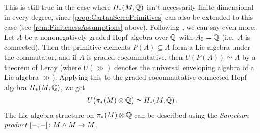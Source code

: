 This is still true in the case where $H_*(M,\mathbb{Q})$ isn't necessarily finite-dimensional in every degree, since \cref{prop:CartanSerrePrimitives} can also be extended to this case (see \cref{rem:FinitenessAssumptions} above). Following \cite[Appendix]{MilnorMoore}, we can say even more: Let $A$ be a nononegatively graded Hopf algebra over $\mathbb{Q}$ with $A_0=\mathbb{Q}$ (i.e.\ $A$ is connected). Then the primitive elements $P(A)\subseteq A$ form a Lie algebra under the commutator, and if $A$ is graded cocommutative, then $U(P(A))\simeq A$ by a theorem of Leray (where $U(\gg)$ denotes the universal enveloping algebra of a Lie algebra $\gg$). Applying this to the graded cocommutative connected Hopf algebra $H_*(M,\mathbb{Q})$, we get
\begin{equation*}
	U\big(\pi_*(M)\otimes \mathbb{Q}\big)\simeq H_*(M,\mathbb{Q})\,.
\end{equation*}
The Lie algebra structure on $\pi_*(M)\otimes \mathbb{Q}$ can be described using the \emph{Samelson product} $[-,-]\colon M\wedge M\morphism M$.


